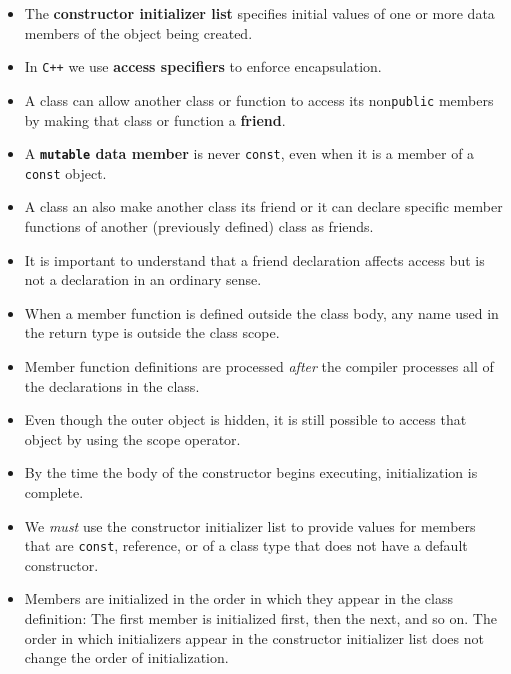 \begin{itemize}
\item
The \textbf{constructor initializer list} specifies initial values of one or more data members of the object being created.

\item
In \texttt{C++} we use \textbf{access specifiers} to enforce encapsulation.

\item
A class can allow another class or function to access its non\texttt{public} members by making that class or function a \textbf{friend}.

\item
A \textbf{\texttt{mutable} data member} is never \texttt{const}, even when it is a member of a \texttt{const} object.

\item
A class an also make another class its friend or it can declare specific member functions of another (previously defined) class as friends.

\item
It is important to understand that a friend declaration affects access but is not a declaration in an ordinary sense.

\item
When a member function is defined outside the class body, any name used in the return type is outside the class scope.

\item
Member function definitions are processed \textit{after} the compiler processes all of the declarations in the class.

\item
Even though the outer object is hidden, it is still possible to access that object by using the scope operator.

\item
By the time the body of the constructor begins executing, initialization is complete.

\item
We \textit{must} use the constructor initializer list to provide values for members that are \texttt{const}, reference, or of a class type that does not have a default constructor.

\item
Members are initialized in the order in which they appear in the class definition: The first member is initialized first, then the next, and so on. The order in which initializers appear in the constructor initializer list does not change the order of initialization.


\end{itemize}

